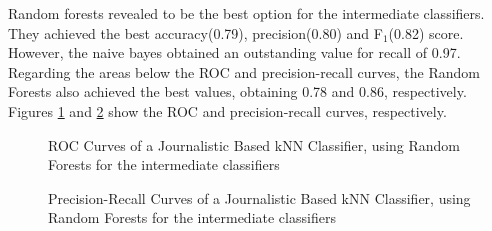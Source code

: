 Random forests revealed to be the best option for the intermediate classifiers. They achieved the best accuracy(0.79), precision(0.80) and F$_1$(0.82) score. However, the naive bayes obtained an outstanding value for recall of 0.97. Regarding the areas below the ROC and precision-recall curves, the Random Forests also achieved the best values, obtaining 0.78 and 0.86, respectively. Figures \ref{fig:rt-journalistic-relevance-roc} and \ref{fig:rt-journalistic-relevance-pr} show the ROC and precision-recall curves, respectively.

\begin{figure}[H]
	\centering
	\caption[ROC Curves of a Journalistic Based kNN Classifier, using Random Forests for the intermediate classifiers]{ROC Curves of a Journalistic Based kNN Classifier, using Random Forests for the intermediate classifiers}
	\label{fig:rt-journalistic-relevance-roc}
\end{figure}

\begin{figure}[H]
	\centering
	\caption[Precision-Recall Curves of a Journalistic Based kNN Classifier, using Random Forests for the intermediate classifiers]{Precision-Recall Curves of a Journalistic Based kNN Classifier, using Random Forests for the intermediate classifiers}
	\label{fig:rt-journalistic-relevance-pr}
\end{figure}

